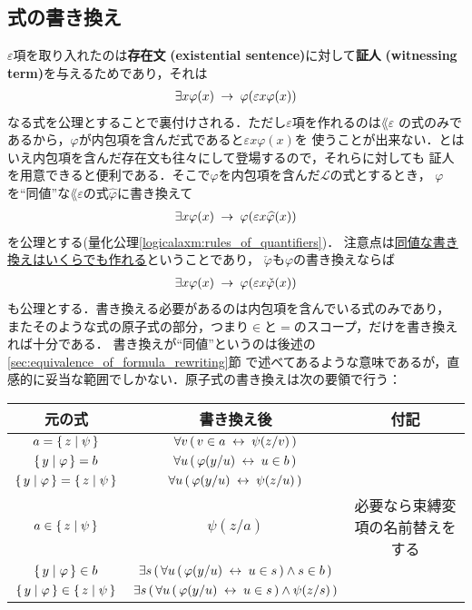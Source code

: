 \subsection{式の書き換え}
\label{subsec:formula_rewriting}
	$\varepsilon$項を取り入れたのは{\bf 存在文}
	{\bf (existential sentence)}に対して{\bf 証人}
	{\bf (witnessing term)}を与えるためであり，それは
	\begin{align}
		\exists x \varphi(x) \hspace{0.25em}\rightarrow\hspace{0.25em} \varphi(\varepsilon x \varphi(x))
	\end{align}
	なる式を公理とすることで裏付けされる．ただし$\varepsilon$項を作れるのは$\lang{\varepsilon}$
	の式のみであるから，$\varphi$が内包項を含んだ式であると$\varepsilon x \varphi(x)$を
	使うことが出来ない．とはいえ内包項を含んだ存在文も往々にして登場するので，それらに対しても
	証人を用意できると便利である．そこで$\varphi$を内包項を含んだ$\mathcal{L}$の式とするとき，
	$\varphi$を``同値''な$\lang{\varepsilon}$の式$\widehat{\varphi}$に書き換えて
	\begin{align}
		\exists x \varphi(x) \hspace{0.25em}\rightarrow\hspace{0.25em} \varphi(\varepsilon x \widehat{\varphi}(x))
	\end{align}
	を公理とする(量化公理\ref{logicalaxm:rules_of_quantifiers})．
	注意点は\underline{同値な書き換えはいくらでも作れる}ということであり，
	$\check{\varphi}$も$\varphi$の書き換えならば
	\begin{align}
		\exists x \varphi(x) \hspace{0.25em}\rightarrow\hspace{0.25em} \varphi(\varepsilon x \check{\varphi}(x))
	\end{align}
	も公理とする．書き換える必要があるのは内包項を含んでいる式のみであり，
	またそのような式の原子式の部分，つまり$\in$と$=$のスコープ，だけを書き換えれば十分である．
	書き換えが``同値''というのは後述の\ref{sec:equivalence_of_formula_rewriting}節
	で述べてあるような意味であるが，直感的に妥当な範囲でしかない．原子式の書き換えは次の要領で行う：
	
	\begin{table}[H]
		\begin{center}
		\begin{tabular}{c|c|c}
			元の式 & 書き換え後 & 付記 \\ \hline \hline
			$a = \{\, z \mid \psi\, \}$ & $\forall v\, (\, v \in a \hspace{0.25em}\leftrightarrow\hspace{0.25em} \psi(z/v)\, )$ & \\ \hline
			$\{\, y \mid \varphi\, \} = b$ & $\forall u\, (\, \varphi(y/u) \hspace{0.25em}\leftrightarrow\hspace{0.25em} u \in b\, )$ & \\ \hline
			$\{\, y \mid \varphi\, \} = \{\, z \mid \psi\, \}$ & $\forall u\, (\, \varphi(y/u) \hspace{0.25em}\leftrightarrow\hspace{0.25em} \psi(z/u)\, )$ & \\ \hline
			$a \in \{\, z \mid \psi\, \}$ & $\psi(z/a)$ & 必要なら束縛変項の名前替えをする \\ \hline
			$\{\, y \mid \varphi\, \} \in b$ & $\exists s\, (\, \forall u\, (\, \varphi(y/u) \hspace{0.25em}\leftrightarrow\hspace{0.25em} u \in s\, ) \wedge s \in b\, )$ & \\ \hline
			$\{\, y \mid \varphi\, \} \in \{\, z \mid \psi\, \}$ & $\exists s\, (\, \forall u\, (\, \varphi(y/u) \hspace{0.25em}\leftrightarrow\hspace{0.25em} u \in s\, ) \wedge \psi(z/s)\, )$ & \\ \hline
		\end{tabular}
		\end{center}
	\end{table}
	
